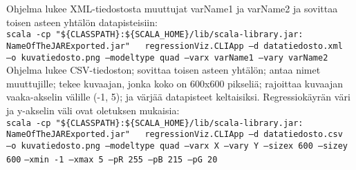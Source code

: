 \documentclass{article}
\begin{document}
  Ohjelma lukee XML-tiedostosta muuttujat varName1 ja varName2 ja sovittaa toisen asteen yhtälön datapisteisiin: \\

  \texttt{scala -cp "\$\{CLASSPATH\}:\$\{SCALA\_HOME\}/lib/scala-library.jar:} \\
  \texttt{NameOfTheJARExported.jar" \, regressionViz.CLIApp --d datatiedosto.xml} \\
  \texttt{--o kuvatiedosto.png --modeltype quad --varx varName1 --vary varName2}\\

  Ohjelma lukee CSV-tiedoston; sovittaa toisen asteen yhtälön; antaa nimet muuttujille; tekee kuvaajan,
  jonka koko on 600x600 pikseliä; rajoittaa kuvaajan vaaka-akselin välille (-1, 5); ja värjää
  datapisteet keltaisiksi. Regressiokäyrän väri ja y-akselin väli ovat oletuksen mukaisia: \\

  \texttt{scala -cp "\$\{CLASSPATH\}:\$\{SCALA\_HOME\}/lib/scala-library.jar:} \\
  \texttt{NameOfTheJARExported.jar" \, regressionViz.CLIApp --d datatiedosto.csv} \\
  \texttt{--o kuvatiedosto.png --modeltype quad --varx X --vary Y --sizex 600 --sizey 600}
  \texttt{--xmin -1 --xmax 5 --pR 255 --pB 215 --pG 20}
      
        
\end{document}
